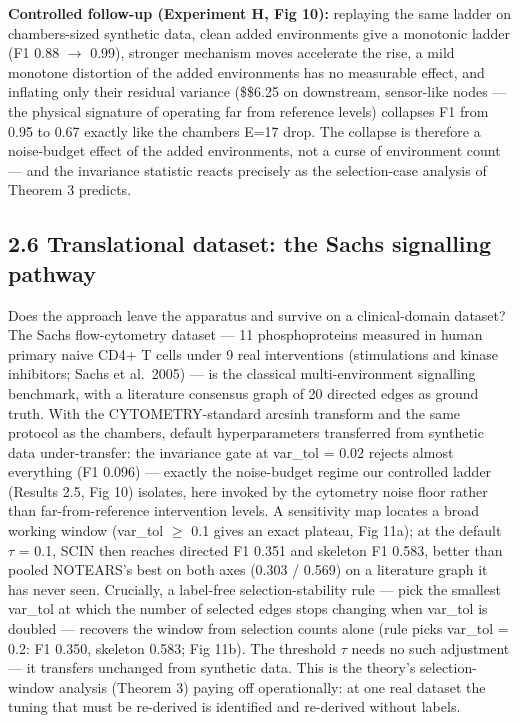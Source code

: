 \documentclass[11pt]{article}
\begin{document}
\textbf{Controlled follow-up (Experiment H, Fig 10):} replaying the same
ladder on chambers-sized synthetic data, clean added environments give
a monotonic ladder (F1 0.88 \(\rightarrow\) 0.99), stronger mechanism moves
accelerate the rise, a mild monotone distortion of the added
environments has no measurable effect, and inflating only their
residual variance (\$\times\$6.25 on downstream, sensor-like nodes --- the
physical signature of operating far from reference levels) collapses
F1 from 0.95 to 0.67 exactly like the chambers E=17 drop. The collapse
is therefore a noise-budget effect of the added environments, not a
curse of environment count --- and the invariance statistic reacts
precisely as the selection-case analysis of Theorem 3 predicts.

\subsection{2.6 Translational dataset: the Sachs signalling pathway}\label{results-2.6-translational-dataset-the-sachs-signalling-pathway-exp-i}

Does the approach leave the apparatus and survive on a clinical-domain
dataset? The Sachs flow-cytometry dataset --- 11 phosphoproteins measured
in human primary naive CD4+ T cells under 9 real interventions
(stimulations and kinase inhibitors; Sachs et al.~2005) --- is the
classical multi-environment signalling benchmark, with a literature
consensus graph of 20 directed edges as ground truth. With the
CYTOMETRY-standard arcsinh transform and the same protocol as the
chambers, default hyperparameters transferred from synthetic data
under-transfer: the invariance gate at var\_tol = 0.02 rejects almost
everything (F1 0.096) --- exactly the noise-budget regime our controlled
ladder (Results 2.5, Fig 10) isolates, here invoked by the cytometry
noise floor rather than far-from-reference intervention levels. A
sensitivity map locates a broad working window (var\_tol \(\geq\) 0.1 gives an
exact plateau, Fig 11a); at the default \(\tau\) = 0.1, SCIN then reaches
directed F1 0.351 and skeleton F1 0.583, better than pooled NOTEARS's
best on both axes (0.303 / 0.569) on a literature graph it has never
seen. Crucially, a label-free selection-stability rule --- pick the
smallest var\_tol at which the number of selected edges stops changing
when var\_tol is doubled --- recovers the window from selection counts
alone (rule picks var\_tol = 0.2: F1 0.350, skeleton 0.583; Fig 11b).
The threshold \(\tau\) needs no such adjustment --- it transfers unchanged from
synthetic data. This is the theory's selection-window analysis
(Theorem 3) paying off operationally: at one real dataset the tuning
that must be re-derived is identified and re-derived without labels.
\end{document}
